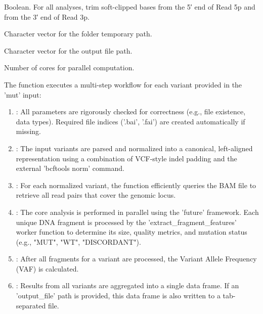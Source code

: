 \documentclass[a4paper]{book}
\begin{document}
\begin{Arguments}
\begin{ldescription}
\item[\code{remove\_softclip}] Boolean. For all analyses, trim soft-clipped bases from the 5′ end of Read 5p and from the 3′ end of Read 3p.

\item[\code{tmp\_folder}] Character vector for the folder temporary path.

\item[\code{output\_file}] Character vector for the output file path.

\item[\code{n\_cores}] Number of cores for parallel computation.
\end{ldescription}
\end{Arguments}
%
\begin{Details}
The function executes a multi-step workflow for each variant provided in the
'mut' input:
\begin{enumerate}

\item{} : All parameters are rigorously checked for correctness (e.g., file existence, data types).
Required file indices ('.bai', '.fai') are created automatically if missing.
\item{} : The input variants are parsed and normalized into a canonical, left-aligned
representation using a combination of VCF-style indel padding and the external 'bcftools norm' command.
\item{} : For each normalized variant, the function efficiently queries the BAM file to
retrieve all read pairs that cover the genomic locus.
\item{} : The core analysis is performed in parallel using the 'future' framework.
Each unique DNA fragment is processed by the 'extract\_fragment\_features' worker function to determine
its size, quality metrics, and mutation status (e.g., "MUT", "WT", "DISCORDANT").
\item{} : After all fragments for a variant are processed, the Variant Allele Frequency (VAF) is calculated.
\item{} : Results from all variants are aggregated into a single data frame. If an 'output\_file'
path is provided, this data frame is also written to a tab-separated file.

\end{enumerate}

\end{Details}
\end{document}
